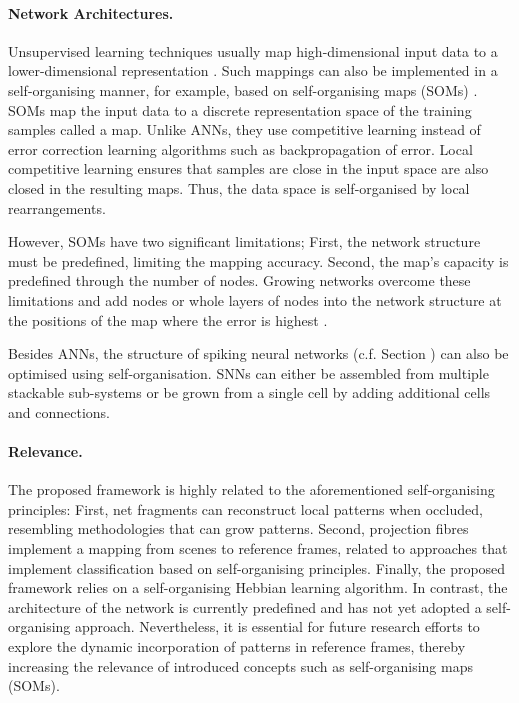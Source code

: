 \paragraph{Network Architectures.}
Unsupervised learning techniques usually map high-dimensional input data to a lower-dimensional representation \cite{russell_artificial_2021}. Such mappings can also be implemented in a self-organising manner, for example, based on self-organising maps (SOMs) .
SOMs map the input data to a discrete representation space of the training samples called a map.
Unlike ANNs, they use competitive learning instead of error correction learning algorithms such as backpropagation of error.
Local competitive learning ensures that samples are close in the input space are also closed in the resulting maps.
Thus, the data space is self-organised by local rearrangements.

However, SOMs have two significant limitations; First, the network structure must be predefined, limiting the mapping accuracy. Second, the map's capacity is predefined through the number of nodes.
Growing networks overcome these limitations and add nodes or whole layers of nodes into the network structure at the positions of the map where the error is highest \cite{reilly_neural_1982, fritzke_growing_1994, marsland_self-organising_2002}.

Besides ANNs, the structure of spiking neural networks (c.f. Section ) can also be optimised using self-organisation. 
SNNs can either be assembled from multiple stackable sub-systems 
or be grown from a single cell \cite{raghavan_neural_2019} by adding additional cells and connections.

\paragraph{Relevance.} The proposed framework is highly related to the aforementioned self-organising principles: First, net fragments can reconstruct local patterns when occluded, resembling methodologies that can grow patterns. Second, projection fibres implement a mapping from scenes to reference frames, related to approaches that implement classification based on self-organising principles. Finally, the proposed framework relies on a self-organising Hebbian learning algorithm.
In contrast, the architecture of the network is currently predefined and has not yet adopted a self-organising approach. Nevertheless, it is essential for future research efforts to explore the dynamic incorporation of patterns in reference frames, thereby increasing the relevance of introduced concepts such as self-organising maps (SOMs).



